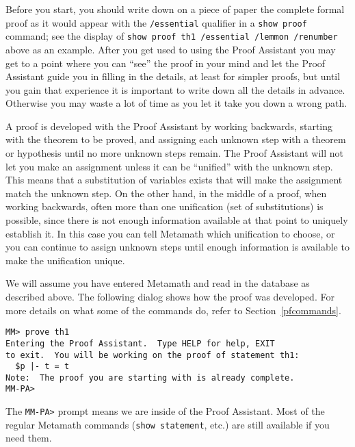 Before you start, you should write down on a piece of paper the complete
formal proof as it would appear with the \texttt{/essential}
qualifier in a \texttt{show proof} command; see
the display of \texttt{show proof th1 /essential /lemmon /re\-num\-ber} above as an
example.  After you get used to using the Proof Assistant you may get to a point where you can ``see'' the proof in your mind
and let the Proof Assistant guide you in filling in the details, at least for
simpler proofs, but until you gain that experience it is important to write
down all the details in advance.  Otherwise you may waste a lot of time as you
let it take you down a wrong path.

A proof is developed with the Proof Assistant by working backwards, starting
with the theorem to be proved, and assigning each unknown step
with a theorem or hypothesis until no more unknown steps remain.  The Proof
Assistant will not let you make an assignment unless it can be ``unified''
with the unknown step.  This means that a
substitution of
variables exists that will make the assignment match the unknown step.  On the
other hand, in the middle of a proof, when working backwards, often more than
one unification (set of substitutions) is possible, since
there is not enough information available at that point to uniquely establish
it.  In this case you can tell Metamath which unification to choose, or you
can continue to assign unknown steps until enough information is available to
make the unification unique.

We will assume you have entered Metamath and read in the database as described
above.  The following dialog shows how the proof was developed.  For more
details on what some of the commands do, refer to Section~\ref{pfcommands}.

\begin{verbatim}
MM> prove th1
Entering the Proof Assistant.  Type HELP for help, EXIT
to exit.  You will be working on the proof of statement th1:
  $p |- t = t
Note:  The proof you are starting with is already complete.
MM-PA>
\end{verbatim}

The \verb/MM-PA>/ prompt means we are inside of the Proof
Assistant. Most of the regular Metamath commands
(\texttt{show statement}, etc.) are still available if you need them.

